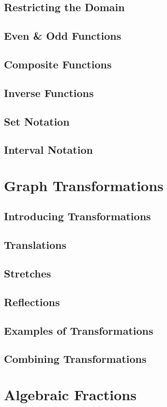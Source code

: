 \documentclass[../maths.tex]{subfiles}
\begin{document}
\subsection*{Restricting the Domain}
\subsection*{Even \& Odd Functions}
\subsection*{Composite Functions}
\subsection*{Inverse Functions}
\subsection*{Set Notation}
\subsection*{Interval Notation}
\section{Graph Transformations}
\subsection*{Introducing Transformations}
\subsection*{Translations}
\subsection*{Stretches}
\subsection*{Reflections}
\subsection*{Examples of Transformations}
\subsection*{Combining Transformations}
\section{Algebraic Fractions}
\end{document}
